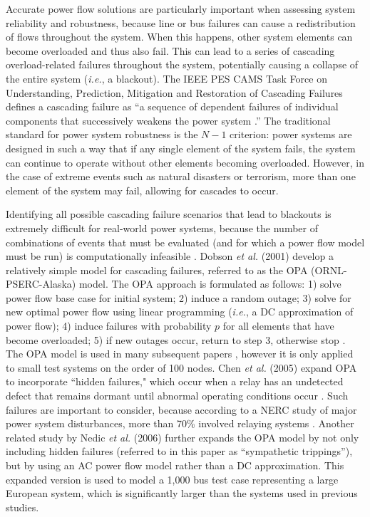 Accurate power flow solutions are particularly important when assessing system reliability and robustness, because line or bus failures can cause a redistribution of flows throughout the system. When this happens, other system elements can become overloaded and thus also fail. This can lead to a series of cascading overload-related failures throughout the system, potentially causing a collapse of the entire system (\emph{i.e.}, a blackout).  The IEEE PES CAMS Task Force on Understanding, Prediction, Mitigation and Restoration of Cascading Failures defines a cascading failure as ``a sequence of dependent failures of individual components that successively weakens the power system \cite{Baldick2008}.''  The traditional standard for power system robustness  is the $N-1$ criterion: power systems are designed in such a way that if any single element of the system fails, the system can continue to operate without other elements becoming overloaded.  However, in the case of extreme events such as natural disasters or terrorism, more than one element of the system may fail, allowing for cascades to occur.

Identifying all possible cascading failure scenarios that lead to blackouts is extremely difficult for real-world power systems, because the number of combinations of events that must be evaluated (and for which a power flow model must be run) is computationally infeasible \cite{Baldick2008}.  Dobson \emph{et al.} (2001) develop a relatively simple model for cascading failures, referred to as the OPA (ORNL-PSERC-Alaska) model. The OPA approach is formulated as follows: 1) solve power flow base case for initial system; 2) induce a random outage; 3) solve for new optimal power flow using linear programming (\emph{i.e.}, a DC approximation of power flow); 4) induce failures with probability $p$ for all elements that have become overloaded; 5) if new outages occur, return to step 3, otherwise stop \cite{Dobson2001}.  The OPA model is used in many subsequent papers \cite{Carreras2001, Carreras2002a, Carreras2002b, Dobson2007}, however it is only applied to small test systems on the order of 100 nodes. Chen \emph{et al.} (2005) expand OPA to incorporate ``hidden failures," which occur when a relay has an undetected defect that remains dormant until abnormal operating conditions occur \cite{Chen2005}.  Such failures are important to consider, because according to a NERC study of major power system disturbances, more than 70\% involved relaying systems \cite{Chen2005}. Another related study by Nedic \emph{et al.} (2006) further expands the OPA model by not only including hidden failures (referred to in this paper as ``sympathetic trippings''), but by using an AC power flow model rather than a DC approximation. This expanded version is used to model a 1,000 bus test case representing a large European system, which is significantly larger than the systems used in previous studies.

